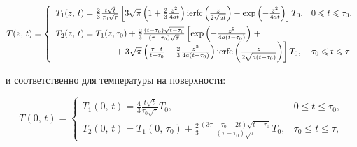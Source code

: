 \begin{equation}

\label{gurevs:eq7}

T(z,\, t) = \left\{ {\begin{array}{ll}

 T_1 (z,\, t) = \frac{2}{3}\frac{t\sqrt t }{\tau _0 \sqrt \tau }\left[ {3\sqrt 

\pi \left( {1 + \frac{2}{3}\frac{z^2}{4at}} \right){\rm ierfc}\left( 

{\frac{z}{2\sqrt {at} }} \right) - \exp \left( { - \frac{z^2}{4at}} \right)} 

\right]T_0 , & 0 \leqslant t \leqslant \tau _0, \vspace{2mm}

\\ 

 T_2 (z,\, t) = T_1 (z,\tau _0 ) + \frac{2}{3}\frac{\left( {t - \tau _0 } 

\right)\sqrt {t - \tau _0 } }{\left( {\tau - \tau _0 } \right)\sqrt \tau 

}\left[ {\exp \left( { - \frac{z^2}{4a\left( {t - \tau _0 } \right)}} 

\right)} \right. + & \\ 

\qquad \quad \qquad  \qquad  + \left. 3\sqrt \pi \left( 

{\frac{\tau - t}{t - \tau _0 } - \frac{2}{3}\frac{z^2}{4a\left( {t - \tau _0 

} \right)}} \right){\rm ierfc}\left( {\frac{z}{2\sqrt {a\left( {t - \tau _0 } 

\right)} }} \right) \right]T_0 ,&

\tau _0 \leqslant t \leqslant \tau

 \end{array}} \right.

\end{equation}

и соответственно для температуры на поверхности:

\begin{equation}

\label{gurevs:eq8}

T(0,\,t) = \left\{ {\begin{array}{ll}

 T_1 (0,\,t) = \frac{4}{3}\frac{t\sqrt t }{\tau _0 \sqrt \tau }T_0 , 

&

0 \leqslant t \leqslant \tau _0, \\ 

T_2 (0,\,t) = T_1 (0,\, \tau _0 ) + \frac{2}{3}\frac{\left( {3\tau - \tau _0 - 

2t} \right)\sqrt {t - \tau _0 } }{\left( {\tau - \tau _0 } \right)\sqrt \tau 

}T_0, 

& \tau _0 \leqslant t \leqslant \tau,

 \end{array}} \right.

\end{equation}

